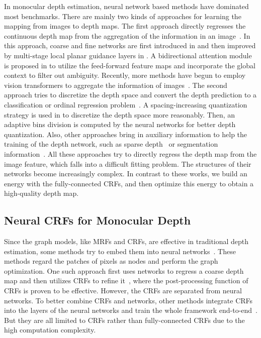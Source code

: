 \documentclass[10pt,twocolumn,letterpaper]{article}
\begin{document}
In monocular depth estimation, neural network based methods have dominated most benchmarks.
There are mainly two kinds of approaches for learning the mapping from images to depth maps.
The first approach directly regresses the continuous depth map from the aggregation of the information in an image~\cite{eigen2014depth, qi2018geonet, lee2019big, yin2019enforcing, aich2020bidirectional, huynh2020guiding, lee2021patch, ranftl2021vision}. 
In this approach, coarse and fine networks are first introduced in \cite{eigen2014depth} and then improved by multi-stage local planar guidance layers in \cite{lee2019big}. 
A bidirectional attention module is proposed in \cite{aich2020bidirectional} to utilize the feed-forward feature maps and incorporate the global context to filter out ambiguity.
Recently, more methods have begun to employ vision transformers to aggregate the information of images~\cite{ranftl2021vision}. 
The second approach tries to discretize the depth space and convert the depth prediction to a classification or ordinal regression problem~\cite{fu2018deep, bhat2021adabins}. A spacing-increasing quantization strategy is used in \cite{fu2018deep} to discretize the depth space more reasonably. Then, an adaptive bins division is computed by the neural networks for better depth quantization. 
Also, other approaches bring in auxiliary information to help the training of the depth network, such as sparse depth~\cite{guizilini2021sparse} or segmentation information~\cite{zhang2019pattern, ochs2019sdnet, klingner2020self, qiao2021vip}.
All these approaches try to directly regress the depth map from the image feature, which falls into a difficult fitting problem. The structures of their networks become increasingly complex.
In contrast to these works, we build an energy with the fully-connected CRFs, and then optimize this energy to obtain a high-quality depth map.


\subsection{Neural CRFs for Monocular Depth}

Since the graph models, like MRFs and CRFs, are effective in traditional depth estimation, some methods try to embed them into neural networks~\cite{li2015depth, liu2015deep, hua2016depth, ricci2018monocular, xu2018structured}. 
These methods regard the patches of pixels as nodes and perform the graph optimization. 
One such approach first uses networks to regress a coarse depth map and then utilizes CRFs to refine it~\cite{li2015depth}, where the post-processing function of CRFs is proven to be effective. 
However, the CRFs are separated from neural networks.
To better combine CRFs and networks, other methods integrate CRFs into the layers of the neural networks and train the whole framework end-to-end~\cite{liu2015deep, hua2016depth, ricci2018monocular, xu2018structured}.
But they are all limited to CRFs rather than fully-connected CRFs due to the high computation complexity. 
\end{document}
